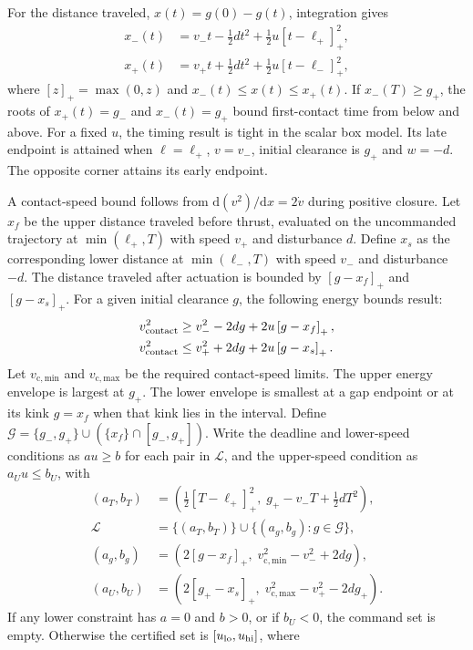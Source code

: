 \documentclass{IEEEtaes}
\newcommand{\pos}[1]{\left[#1\right]_+}
\newcommand{\dd}{\mathrm{d}}
\begin{document}
For the distance traveled, $x(t)=g(0)-g(t)$, integration gives
\begin{align}
x_-(t)&=v_-t-\tfrac{1}{2}dt^2
              +\tfrac{1}{2}u\pos{t-\ell_+}^{2},\label{eq:xslow}\\
x_+(t)&=v_+t+\tfrac{1}{2}dt^2
              +\tfrac{1}{2}u\pos{t-\ell_-}^{2},\label{eq:xfast}
\end{align}
where $\pos{z}=\max(0,z)$ and $x_-(t)\leq x(t)\leq x_+(t)$. If $x_-(T)\geq g_+$, the roots of $x_+(t)=g_-$ and $x_-(t)=g_+$ bound first-contact time from below and above. For a fixed $u$, the timing result is tight in the scalar box model. Its late endpoint is attained when $\ell=\ell_+$, $v=v_-$, initial clearance is $g_+$ and $w=-d$. The opposite corner attains its early endpoint.

A contact-speed bound follows from $\dd(v^2)/\dd x=2\dot v$ during positive closure. Let $x_f$ be the upper distance traveled before thrust, evaluated on the uncommanded trajectory at $\min(\ell_+,T)$ with speed $v_+$ and disturbance $d$. Define $x_s$ as the corresponding lower distance at $\min(\ell_-,T)$ with speed $v_-$ and disturbance $-d$. The distance traveled after actuation is bounded by $\pos{g-x_f}$ and $\pos{g-x_s}$. For a given initial clearance $g$, the following energy bounds result:
\begin{align}
v_{\rm contact}^2
&\geq v_-^2-2dg+2u\pos{g-x_f},\label{eq:lowerenergy}\\
v_{\rm contact}^2
&\leq v_+^2+2dg+2u\pos{g-x_s}.\label{eq:upperenergy}
\end{align}
Let $v_{\mathrm{c,min}}$ and $v_{\mathrm{c,max}}$ be the required contact-speed limits. The upper energy envelope is largest at $g_+$. The lower envelope is smallest at a gap endpoint or at its kink $g=x_f$ when that kink lies in the interval. Define $\mathcal G=\{g_-,g_+\}\cup(\{x_f\}\cap[g_-,g_+])$. Write the deadline and lower-speed conditions as $a u\geq b$ for each pair in $\mathcal L$, and the upper-speed condition as $a_U u\leq b_U$, with
\begin{align*}
(a_T,b_T)&=\left(\tfrac12\pos{T-\ell_+}^2,\;g_+-v_-T+\tfrac12dT^2\right),\\
\mathcal L&=\{(a_T,b_T)\}\cup
             \{(a_g,b_g):g\in\mathcal G\},\\
(a_g,b_g)&=\left(2\pos{g-x_f},\;v_{\mathrm{c,min}}^2-v_-^2+2dg\right),\\
(a_U,b_U)&=\left(2\pos{g_+-x_s},\;v_{\mathrm{c,max}}^2-v_+^2-2dg_+\right).
\end{align*}
If any lower constraint has $a=0$ and $b>0$, or if $b_U<0$, the command set is empty. Otherwise the certified set is $[u_{\rm lo},u_{\rm hi}]$, where
\end{document}

